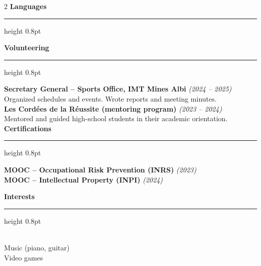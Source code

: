 \documentclass[10.5pt,a4paper]{article}
\newcommand{\subsectitle}[1]{%
  {\color{accent}\bfseries\large #1}\\[-2pt]
  {\color{accent}\hrule height 0.8pt}\vspace{7pt}
}
\newcommand{\sidebardated}[3]{%
  \textbf{\small #1} {\itshape\color{graytext}\footnotesize (#2)}\\
  {\small #3}\\[3pt]
}
\newcommand{\sidebarcert}[2]{%
  \noindent\textbf{\small #1} {\itshape\color{graytext}\footnotesize (#2)}\\[2pt]
}
\begin{document}
\begin{paracol}{2}
\subsectitle{Languages}

\vspace{5pt}

\subsectitle{Volunteering}

\sidebardated{Secretary General -- Sports Office, IMT Mines Albi}{2024 -- 2025}{Organized schedules and events. Wrote reports and meeting minutes.}

\sidebardated{Les Cordées de la Réussite (mentoring program)}{2023 -- 2024}{Mentored and guided high-school students in their academic orientation.}

\subsectitle{Certifications}

\sidebarcert{MOOC -- Occupational Risk Prevention (INRS)}{2023}
\sidebarcert{MOOC -- Intellectual Property (INPI)}{2024}

\vspace{4pt}

\subsectitle{Interests}
\\
{\small Music (piano, guitar)}\\
{\small Video games}

\end{paracol}
\end{document}
